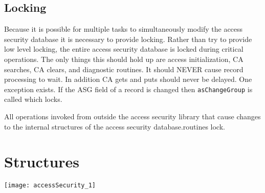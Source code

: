 \subsection{Locking}

Because it is possible for multiple tasks to simultaneously modify the access security database it is necessary to provide 
locking. Rather than try to provide low level locking, the entire access security database is locked during critical 
operations. The only things this should hold up are access initialization, CA searches, CA clears, and diagnostic routines. 
It should NEVER cause record processing to wait. In addition CA gets and puts should never be delayed. One exception 
exists. If the ASG field of a record is changed then \verb|asChangeGroup| is called which locks.

All operations invoked from outside the access security library that cause changes to the internal structures of the access 
security database.routines lock.

\newpage

\section{Structures}

\begin{center}
\texttt{[image: accessSecurity\_1]}
\end{center}
